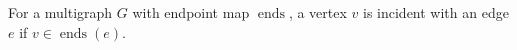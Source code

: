 \begin{definition}
For a multigraph $G$ with endpoint map $\operatorname{ends}$, a vertex $v$
is incident with an edge $e$ if $v\in\operatorname{ends}(e)$.
\end{definition}
